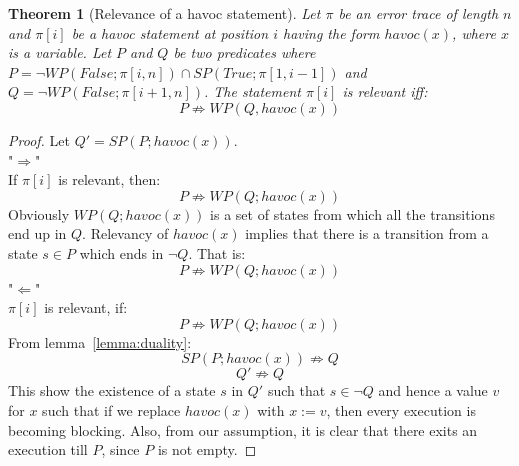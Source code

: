 \documentclass{article}
\newcommand{\limp}{\Rightarrow}
\newtheorem{theorem}{Theorem}
\begin{document}
\newpage
\begin{theorem}[Relevance of a havoc statement]\label{mydef:relevancytheorem}
Let $\pi$ be an error trace of length $n$ and $\pi[i]$ be a havoc statement at position $i$ having the form $havoc(x)$, where $x$ is a variable. Let $P$ and $Q$ be two predicates where $P = \neg WP(False; \pi[i,n]) \cap SP(True; \pi[1,i-1])$ and $Q =  \neg WP(False; \pi[i+1,n])$. The statement $\pi[i]$ is relevant iff:
 $$P \not \limp WP(Q,havoc(x))$$
\end{theorem}

\begin{proof}
Let $Q'=SP(P;havoc(x))$.\\
"$\Rightarrow$"\\
If $\pi[i]$ is relevant, then:
$$P \not \limp WP(Q; havoc(x))$$
Obviously $WP(Q;havoc(x))$ is a set of states from which all the transitions end up in $Q$. Relevancy of $havoc(x)$ implies that there is a transition from a state $s \in P$ which ends in $\neg Q$. That is:
$$P \not \limp WP(Q;havoc(x))$$
"$\Leftarrow$" \\
$\pi[i]$ is relevant, if:
$$P \not \limp WP(Q; havoc(x))$$
From lemma~\ref{lemma:duality}:
$$SP(P; havoc(x)) \not \limp Q$$
$$Q' \not \limp Q$$
This show the existence of a state $s$ in $Q'$ such that $s \in \neg Q$ and hence a value $v$ for $x$ such that if we replace $havoc(x)$ with $x:=v$, then every execution is becoming blocking. Also, from our assumption, it is clear that there exits an execution till $P$, since $P$ is not empty.
\end{proof}
\end{document}
